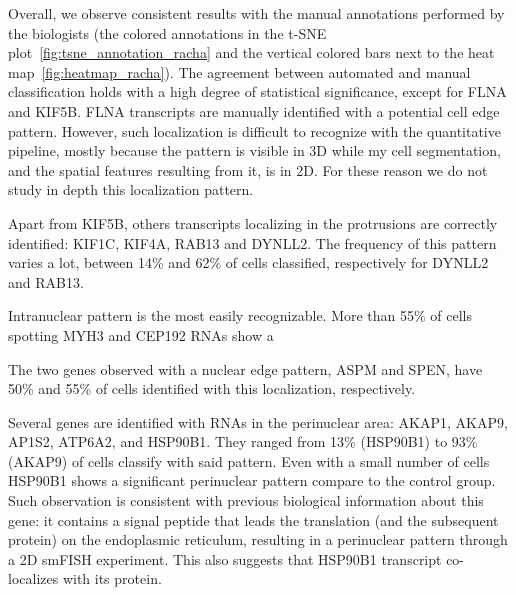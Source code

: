 Overall, we observe consistent results with the manual annotations performed by the biologists (the colored annotations in the \ac{t-SNE} plot~\ref{fig:tsne_annotation_racha} and the vertical colored bars next to the heat map~\ref{fig:heatmap_racha}).
The agreement between automated and manual classification holds with a high degree of statistical significance, except for FLNA and KIF5B.
FLNA transcripts are manually identified with a potential cell edge pattern.
However, such localization is difficult to recognize with the quantitative pipeline, mostly because the pattern is visible in 3D while my cell segmentation, and the spatial features resulting from it, is in 2D.
For these reason we do not study in depth this localization pattern.

Apart from KIF5B, others transcripts localizing in the protrusions are correctly identified: KIF1C, KIF4A, RAB13 and DYNLL2.
The frequency of this pattern varies a lot, between 14\% and 62\% of cells classified, respectively for DYNLL2 and RAB13.

Intranuclear pattern is the most easily recognizable.
More than 55\% of cells spotting MYH3 and CEP192 \ac{RNA}s show a

The two genes observed with a nuclear edge pattern, ASPM and SPEN, have 50\% and 55\% of cells identified with this localization, respectively.

Several genes are identified with \ac{RNA}s in the perinuclear area: AKAP1, AKAP9, AP1S2, ATP6A2, and HSP90B1.
They ranged from 13\% (HSP90B1) to 93\% (AKAP9) of cells classify with said pattern.
Even with a small number of cells HSP90B1 shows a significant perinuclear pattern compare to the control group.
Such observation is consistent with previous biological information about this gene: it contains a signal peptide that leads the translation (and the subsequent protein) on the endoplasmic reticulum, resulting in a perinuclear pattern through a 2D \ac{smFISH} experiment.
This also suggests that HSP90B1 transcript co-localizes with its protein.

